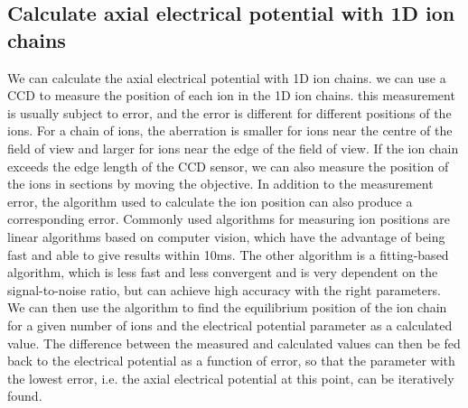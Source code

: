 \subsection{Calculate axial electrical potential with 1D ion chains}

We can calculate the axial electrical potential with 1D ion chains. we can use a CCD to measure the position of each ion in the 1D ion chains. this measurement is usually subject to error, and the error is different for different positions of the ions. For a chain of ions, the aberration is smaller for ions near the centre of the field of view and larger for ions near the edge of the field of view. If the ion chain exceeds the edge length of the CCD sensor, we can also measure the position of the ions in sections by moving the objective. In addition to the measurement error, the algorithm used to calculate the ion position can also produce a corresponding error. Commonly used algorithms for measuring ion positions are linear algorithms based on computer vision, which have the advantage of being fast and able to give results within 10ms. The other algorithm is a fitting-based algorithm, which is less fast and less convergent and is very dependent on the signal-to-noise ratio, but can achieve high accuracy with the right parameters. We can then use the algorithm to find the equilibrium position of the ion chain for a given number of ions and the electrical potential parameter as a calculated value. The difference between the measured and calculated values can then be fed back to the electrical potential as a function of error, so that the parameter with the lowest error, i.e. the axial electrical potential at this point, can be iteratively found.
